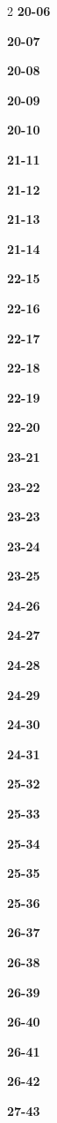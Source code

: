 \documentclass[10pt,a4paper]{article}
\begin{document}
\begin{multicols}{2}
\noindent\textbf{20-06}\ \par
\noindent\textbf{20-07}\ \par
\noindent\textbf{20-08}\ \par
\noindent\textbf{20-09}\ \par
\noindent\textbf{20-10}\ \par
\noindent\textbf{21-11}\ \par
\noindent\textbf{21-12}\ \par
\noindent\textbf{21-13}\ \par
\noindent\textbf{21-14}\ \par
\noindent\textbf{22-15}\ \par
\noindent\textbf{22-16}\ \par
\noindent\textbf{22-17}\ \par
\noindent\textbf{22-18}\ \par
\noindent\textbf{22-19}\ \par
\noindent\textbf{22-20}\ \par
\noindent\textbf{23-21}\ \par
\noindent\textbf{23-22}\ \par
\noindent\textbf{23-23}\ \par
\noindent\textbf{23-24}\ \par
\noindent\textbf{23-25}\ \par
\noindent\textbf{24-26}\ \par
\noindent\textbf{24-27}\ \par
\noindent\textbf{24-28}\ \par
\noindent\textbf{24-29}\ \par
\noindent\textbf{24-30}\ \par
\noindent\textbf{24-31}\ \par
\noindent\textbf{25-32}\ \par
\noindent\textbf{25-33}\ \par
\noindent\textbf{25-34}\ \par
\noindent\textbf{25-35}\ \par
\noindent\textbf{25-36}\ \par
\noindent\textbf{26-37}\ \par
\noindent\textbf{26-38}\ \par
\noindent\textbf{26-39}\ \par
\noindent\textbf{26-40}\ \par
\noindent\textbf{26-41}\ \par
\noindent\textbf{26-42}\ \par
\noindent\textbf{27-43}\ \par

\end{multicols}
\end{document}
